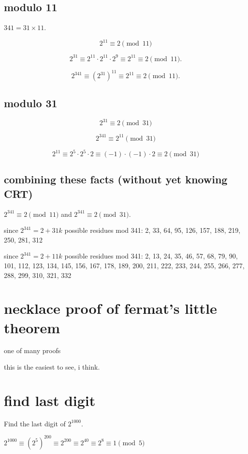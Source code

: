 \documentclass[12pt]{handout}
\begin{document}
\subsection*{modulo 11}

$341 = 31 \times 11$.

$$2^{11} \equiv 2 \pmod{11}$$

$$2^{31} \equiv 2^{11} \cdot 2^{11} \cdot 2^{9} \equiv 2^{11} \equiv 2 \pmod{11}.$$

$$
2^{341} \equiv \left(2^{31}\right)^{11} \equiv 2^{11} \equiv 2 \pmod{11}.
$$

\subsection*{modulo 31}

$$2^{31} \equiv 2 \pmod{31}$$

$$2^{341} \equiv 2^{11} \pmod{31}$$

$$2^{11} \equiv 2^5 \cdot 2^5 \cdot 2 \equiv (-1) \cdot (-1) \cdot 2 \equiv 2 \pmod{31}$$

\subsection*{combining these facts (without yet knowing CRT)}

$2^{341} \equiv 2 \pmod{11}$ and $2^{341} \equiv 2 \pmod{31}$.

since $2^{341} = 2 + 31k$ possible residues mod 341: 2, 33, 64, 95, 126, 157, 188, 219, 250, 281, 312

since $2^{341} = 2 + 11k$ possible residues mod 341: 2, 13, 24, 35, 46, 57, 68, 79, 90, 101, 112, 123, 134, 145, 156, 167, 178, 189, 200, 211, 222, 233, 244, 255, 266, 277, 288, 299, 310, 321, 332

\section*{necklace proof of fermat's little theorem}

one of many proofs

this is the easiest to see, i think.

\section*{find last digit}

Find the last digit of $2^{1000}$.

$2^{1000} \equiv \left(2^5\right)^{200} \equiv 2^{200} \equiv 2^{40} \equiv 2^8 \equiv 1 \pmod 5$
\end{document}
